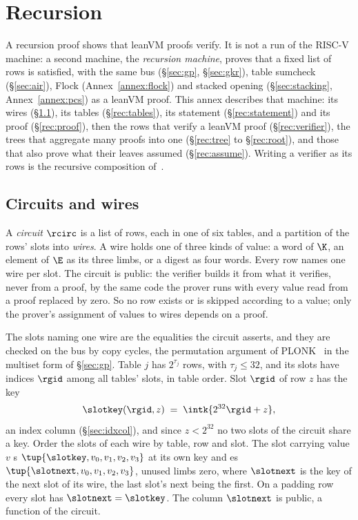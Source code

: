 \section{Recursion}\label{annex:rec}

A recursion proof shows that leanVM proofs verify. It is not a run of the RISC-V machine: a second machine, the \emph{recursion machine}, proves that a fixed list of rows is satisfied, with the same bus (\S\ref{sec:gp}, \S\ref{sec:gkr}), table sumcheck (\S\ref{sec:air}), Flock (Annex~\ref{annex:flock}) and stacked opening (\S\ref{sec:stacking}, Annex~\ref{annex:pcs}) as a leanVM proof. This annex describes that machine: its wires (\S\ref{rec:wires}), its tables (\S\ref{rec:tables}), its statement (\S\ref{rec:statement}) and its proof (\S\ref{rec:proof}), then the rows that verify a leanVM proof (\S\ref{rec:verifier}), the trees that aggregate many proofs into one (\S\ref{rec:tree} to \S\ref{rec:root}), and those that also prove what their leaves assumed (\S\ref{rec:assume}). Writing a verifier as its rows is the recursive composition of~\cite{BCCT13}.

\subsection{Circuits and wires}\label{rec:wires}

A \emph{circuit} $\rcirc$ is a list of rows, each in one of six tables, and a partition of the rows' slots into \emph{wires}. A wire holds one of three kinds of value: a word of $\K$, an element of $\E$ as its three limbs, or a digest as four words. Every row names one wire per slot. The circuit is public: the verifier builds it from what it verifies, never from a proof, by the same code the prover runs with every value read from a proof replaced by zero. So no row exists or is skipped according to a value; only the prover's assignment of values to wires depends on a proof.

The slots naming one wire are the equalities the circuit asserts, and they are checked on the bus by copy cycles, the permutation argument of PLONK~\cite{GWC19} in the multiset form of \S\ref{sec:gp}. Table $j$ has $2^{\tau_j}$ rows, with $\tau_j\le32$, and its slots have indices $\rgid$ among all tables' slots, in table order. Slot $\rgid$ of row $z$ has the key
\[
  \slotkey(\rgid,z)\;=\;\intk{2^{32}\rgid+z},
\]
an index column (\S\ref{sec:idxcol}), and since $z<2^{32}$ no two slots of the circuit share a key. Order the slots of each wire by table, row and slot. The slot carrying value $v$ \pull{}s $\tup{\slotkey,v_0,v_1,v_2,v_3}$ at its own key and \push{}es $\tup{\slotnext,v_0,v_1,v_2,v_3}$, unused limbs zero, where $\slotnext$ is the key of the next slot of its wire, the last slot's next being the first. On a padding row every slot has $\slotnext=\slotkey$. The column $\slotnext$ is public, a function of the circuit.

